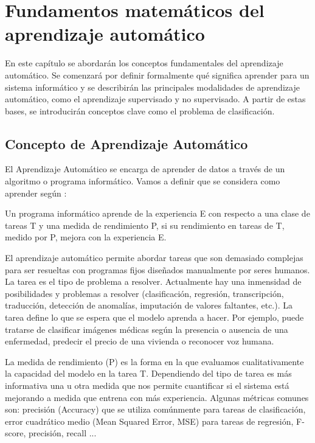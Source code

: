 
\chapter{Fundamentos matemáticos del aprendizaje automático} \label{chap:aa-mates}
En este capítulo se abordarán los conceptos fundamentales del aprendizaje automático. Se comenzará por definir formalmente qué significa aprender para un sistema informático y se describirán las principales modalidades de aprendizaje automático, como el aprendizaje supervisado y no supervisado. A partir de estas bases, se introducirán conceptos clave como el problema de clasificación.



\section{Concepto de Aprendizaje Automático}

El Aprendizaje Automático se encarga de aprender de datos a través de un algoritmo o programa informático. Vamos a definir que se considera como aprender según \cite{mitchell1997machine}: 

\begin{definicion}
Un programa informático aprende de la experiencia E con respecto a una clase de tareas T y una medida de rendimiento P, si su rendimiento en tareas de T, medido por P, mejora con la experiencia E.
\end{definicion}

El aprendizaje automático permite abordar tareas que son demasiado complejas para ser resueltas con programas fijos diseñados manualmente por seres humanos. La tarea es el tipo de problema a resolver. Actualmente hay una inmensidad de posibilidades y problemas a resolver (clasificación, regresión, transcripción, traducción, detección de anomalías, imputación de valores faltantes, etc.). La tarea define lo que se espera que el modelo aprenda a hacer. Por ejemplo, puede tratarse de clasificar imágenes médicas según la presencia o ausencia de una enfermedad, predecir el precio de una vivienda o reconocer voz humana. 

La medida de rendimiento (P) es la forma en la que evaluamos cualitativamente la capacidad del modelo en la tarea T. Dependiendo del tipo de tarea es más informativa una u otra medida que nos permite cuantificar si el sistema está mejorando a medida que entrena con más experiencia. Algunas métricas comunes son: precisión (Accuracy) que se utiliza comúnmente para tareas de clasificación, error cuadrático medio (Mean Squared Error, MSE) para tareas de regresión, F-score, precisión, recall ...

